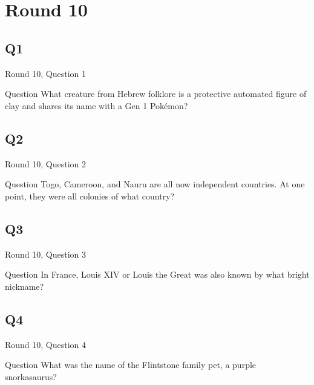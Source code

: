 \documentclass[11pt]{beamer}
\begin{document}
\section{Round 10}
    

\subsection*{Q1}
\begin{frame}[t]{Round 10, Question 1}
\vspace{2em}
\begin{block}{Question}
What creature from Hebrew folklore is a protective automated figure of clay and shares its name with a Gen 1 Pokémon\@?
\end{block}
\end{frame}
    

\subsection*{Q2}
\begin{frame}[t]{Round 10, Question 2}
\vspace{2em}
\begin{block}{Question}
Togo, Cameroon, and Nauru are all now independent countries. At one point, they were all colonies of what country\@?
\end{block}
\end{frame}
    

\subsection*{Q3}
\begin{frame}[t]{Round 10, Question 3}
\vspace{2em}
\begin{block}{Question}
In France, Louis XIV or Louis the Great was also known by what bright nickname\@?
\end{block}
\end{frame}
    

\subsection*{Q4}
\begin{frame}[t]{Round 10, Question 4}
\vspace{2em}
\begin{block}{Question}
What was the name of the Flintstone family pet, a purple snorkasaurus\@?
\end{block}
\end{frame}
    
\end{document}
